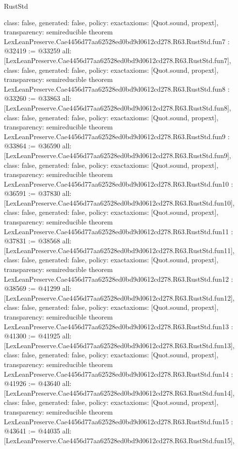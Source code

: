 \begin{lexlean}{RustStd}
\begin{coremodule}
{  class: false,
  generated: false,
  policy: exact{axioms: [Quot.sound, propext]},
  transparency: semireducible
}
theorem LexLeanPreserve.Cae4456d77aa62528ed0bd9d0612cd278.R63.RustStd.fun7 : @32419 := @33259 {
  all: [LexLeanPreserve.Cae4456d77aa62528ed0bd9d0612cd278.R63.RustStd.fun7],
  class: false,
  generated: false,
  policy: exact{axioms: [Quot.sound, propext]},
  transparency: semireducible
}
theorem LexLeanPreserve.Cae4456d77aa62528ed0bd9d0612cd278.R63.RustStd.fun8 : @33260 := @33863 {
  all: [LexLeanPreserve.Cae4456d77aa62528ed0bd9d0612cd278.R63.RustStd.fun8],
  class: false,
  generated: false,
  policy: exact{axioms: [Quot.sound, propext]},
  transparency: semireducible
}
theorem LexLeanPreserve.Cae4456d77aa62528ed0bd9d0612cd278.R63.RustStd.fun9 : @33864 := @36590 {
  all: [LexLeanPreserve.Cae4456d77aa62528ed0bd9d0612cd278.R63.RustStd.fun9],
  class: false,
  generated: false,
  policy: exact{axioms: [Quot.sound, propext]},
  transparency: semireducible
}
theorem LexLeanPreserve.Cae4456d77aa62528ed0bd9d0612cd278.R63.RustStd.fun10 : @36591 := @37830 {
  all: [LexLeanPreserve.Cae4456d77aa62528ed0bd9d0612cd278.R63.RustStd.fun10],
  class: false,
  generated: false,
  policy: exact{axioms: [Quot.sound, propext]},
  transparency: semireducible
}
theorem LexLeanPreserve.Cae4456d77aa62528ed0bd9d0612cd278.R63.RustStd.fun11 : @37831 := @38568 {
  all: [LexLeanPreserve.Cae4456d77aa62528ed0bd9d0612cd278.R63.RustStd.fun11],
  class: false,
  generated: false,
  policy: exact{axioms: [Quot.sound, propext]},
  transparency: semireducible
}
theorem LexLeanPreserve.Cae4456d77aa62528ed0bd9d0612cd278.R63.RustStd.fun12 : @38569 := @41299 {
  all: [LexLeanPreserve.Cae4456d77aa62528ed0bd9d0612cd278.R63.RustStd.fun12],
  class: false,
  generated: false,
  policy: exact{axioms: [Quot.sound, propext]},
  transparency: semireducible
}
theorem LexLeanPreserve.Cae4456d77aa62528ed0bd9d0612cd278.R63.RustStd.fun13 : @41300 := @41925 {
  all: [LexLeanPreserve.Cae4456d77aa62528ed0bd9d0612cd278.R63.RustStd.fun13],
  class: false,
  generated: false,
  policy: exact{axioms: [Quot.sound, propext]},
  transparency: semireducible
}
theorem LexLeanPreserve.Cae4456d77aa62528ed0bd9d0612cd278.R63.RustStd.fun14 : @41926 := @43640 {
  all: [LexLeanPreserve.Cae4456d77aa62528ed0bd9d0612cd278.R63.RustStd.fun14],
  class: false,
  generated: false,
  policy: exact{axioms: [Quot.sound, propext]},
  transparency: semireducible
}
theorem LexLeanPreserve.Cae4456d77aa62528ed0bd9d0612cd278.R63.RustStd.fun15 : @43641 := @44035 {
  all: [LexLeanPreserve.Cae4456d77aa62528ed0bd9d0612cd278.R63.RustStd.fun15],
}
\end{coremodule}
\end{lexlean}
